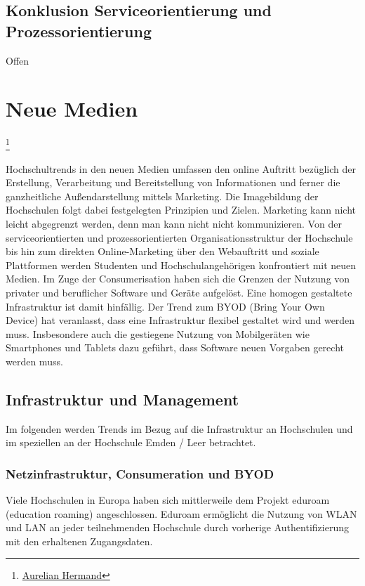 \documentclass[a4paper, 12pt]{scrreprt}
\begin{document}
\subsection{Konklusion Serviceorientierung und Prozessorientierung}
Offen




\section{Neue Medien}
\footnote{\url{Aurelian Hermand}}


Hochschultrends in den neuen Medien umfassen den online Auftritt bezüglich der Erstellung, Verarbeitung und Bereitstellung von Informationen und ferner die ganzheitliche Außendarstellung mittels Marketing. Die Imagebildung der Hochschulen folgt dabei festgelegten Prinzipien und Zielen. Marketing kann nicht leicht abgegrenzt werden, denn man kann nicht nicht kommunizieren. Von der serviceorientierten und prozessorientierten Organisationsstruktur der Hochschule bis hin zum direkten Online-Marketing über den Webauftritt und soziale Plattformen werden Studenten und Hochschulangehörigen konfrontiert mit neuen Medien. Im Zuge der Consumerisation haben sich die Grenzen der Nutzung von privater und beruflicher Software und Geräte aufgelöst. Eine homogen gestaltete Infrastruktur ist damit hinfällig. Der Trend zum BYOD (Bring Your Own Device) hat veranlasst, dass eine Infrastruktur flexibel gestaltet wird und werden muss. Insbesondere auch die gestiegene Nutzung von Mobilgeräten wie Smartphones und Tablets dazu geführt, dass Software neuen Vorgaben gerecht werden muss.


\subsection{Infrastruktur und Management}
Im folgenden werden Trends im Bezug auf die Infrastruktur an Hochschulen und im speziellen an der Hochschule Emden / Leer betrachtet. 

\subsubsection{Netzinfrastruktur, Consumeration und BYOD}
Viele Hochschulen in Europa haben sich mittlerweile dem Projekt eduroam (education roaming) angeschlossen. Eduroam ermöglicht die Nutzung von WLAN und LAN an jeder teilnehmenden Hochschule durch vorherige Authentifizierung mit den erhaltenen Zugangsdaten.
\end{document}
